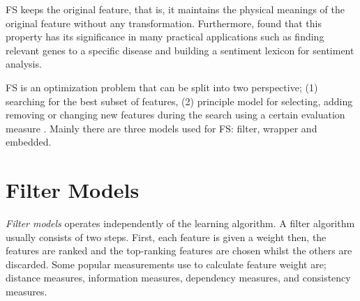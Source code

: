 
FS keeps the original feature, that is, it maintains the physical meanings of the original feature without any transformation. Furthermore, \citet{masaeli2010transformation} found that this property has its significance in many practical applications such as finding relevant genes to a specific disease and building a sentiment lexicon for sentiment analysis.

FS is an optimization problem that can be split into two perspective; (1) searching for the best subset of features, (2) principle model for selecting, adding removing or changing new features during the search using a certain evaluation measure \citep{zhao2010advancing}. Mainly there are three models used for FS: filter, wrapper and embedded.

\section{Filter Models}\label{sec:fs_filter}
\textit{Filter models} operates independently of the learning algorithm. A filter algorithm usually consists of two steps. First, each feature is given a weight then, the features are ranked and the top-ranking features are chosen whilst the others are discarded. Some popular measurements use to calculate feature weight are; distance measures, information measures, dependency measures, and consistency measures.

